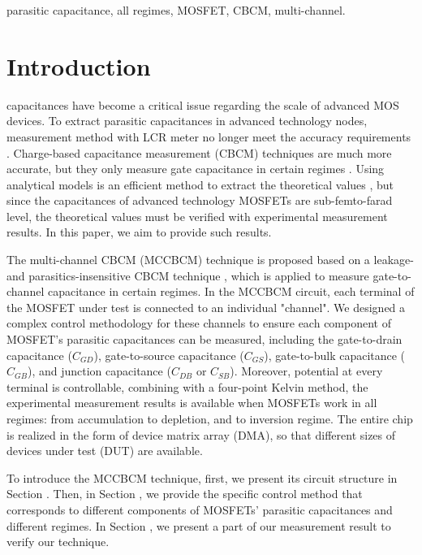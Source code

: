 \documentclass[journal]{IEEEtran}
\begin{document}
\begin{IEEEkeywords}
parasitic capacitance, all regimes, MOSFET, CBCM, multi-channel.
\end{IEEEkeywords}





\IEEEpeerreviewmaketitle


\section{Introduction}

 capacitances have become a critical issue regarding the scale of advanced MOS devices. To extract parasitic capacitances in advanced technology nodes, measurement method with LCR meter no longer meet the accuracy requirements \cite{1,2}. Charge-based capacitance measurement (CBCM) techniques are much more accurate, but they only measure gate capacitance in certain regimes \cite{3,4,5,6}. Using analytical models is an efficient method to extract the theoretical values \cite{7,8,9}, but since the capacitances of advanced technology MOSFETs are sub-femto-farad level, the theoretical values must be verified with experimental measurement results. In this paper, we aim to provide such results.   


The multi-channel CBCM (MCCBCM) technique is proposed based on a leakage- and parasitics-insensitive CBCM technique \cite{5}, which is applied to measure gate-to-channel capacitance in certain regimes. In the MCCBCM circuit, each terminal of the MOSFET under test is connected to an individual "channel". We designed a complex control methodology for these channels to ensure each component of MOSFET's parasitic capacitances can be measured, including the gate-to-drain capacitance ($C_{GD}$), gate-to-source capacitance ($C_{GS}$), gate-to-bulk capacitance ($C_{GB}$), and junction capacitance ($C_{DB}$ or $C_{SB}$). Moreover, potential at every terminal is controllable, combining with a four-point Kelvin method, the experimental measurement results is available when MOSFETs work in all regimes: from accumulation to depletion, and to inversion regime. The entire chip is realized in the form of device matrix array (DMA), so that different sizes of devices under test (DUT) are available. 

To introduce the MCCBCM technique, first, we present its circuit structure in Section \uppercase\expandafter{}. Then, in Section \uppercase\expandafter{}, we provide the specific control method that corresponds to different components of MOSFETs' parasitic capacitances and different regimes. In Section \uppercase\expandafter{}, we present a part of our measurement result to verify our technique.
\end{document}
